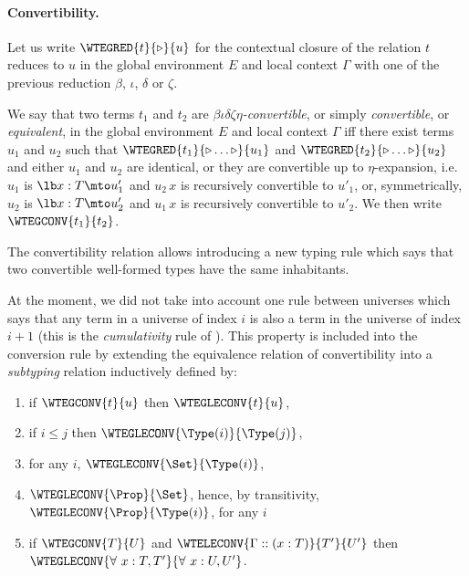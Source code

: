\paragraph[Convertibility.]{Convertibility.\label{convertibility}
}

Let us write $\WTEGRED{t}{\triangleright}{u}$ for the contextual closure of the relation $t$ reduces to $u$ in the global environment $E$ and local context $\Gamma$ with one of the previous reduction $\beta$, $\iota$, $\delta$ or $\zeta$.

We say that two terms $t_1$ and $t_2$ are {\em
  $\beta\iota\delta\zeta\eta$-convertible}, or simply {\em
  convertible}, or {\em equivalent}, in the global environment $E$ and
local context $\Gamma$ iff there exist terms $u_1$ and $u_2$ such that
$\WTEGRED{t_1}{\triangleright \ldots \triangleright}{u_1}$ and
$\WTEGRED{t_2}{\triangleright \ldots \triangleright}{u_2}$ and either
$u_1$ and $u_2$ are identical, or they are convertible up to
$\eta$-expansion, i.e. $u_1$ is $\lb x:T\mto u'_1$ and $u_2\,x$ is
recursively convertible to $u'_1$, or, symmetrically, $u_2$ is $\lb
x:T\mto u'_2$ and $u_1\,x$ is recursively convertible to $u'_2$.  We
then write $\WTEGCONV{t_1}{t_2}$.

The convertibility relation allows introducing a new typing rule
which says that two convertible well-formed types have the same
inhabitants.

At the moment, we did not take into account one rule between universes
which says that any term in a universe of index $i$ is also a term in
the universe of index $i+1$ (this is the {\em cumulativity} rule of
{\CIC}). This property is included into the
conversion rule by extending the equivalence relation of
convertibility into a {\em subtyping} relation inductively defined by:
\begin{enumerate}
\item if $\WTEGCONV{t}{u}$ then $\WTEGLECONV{t}{u}$,
\item if $i \leq j$ then $\WTEGLECONV{\Type(i)}{\Type(j)}$,
\item for any $i$, $\WTEGLECONV{\Set}{\Type(i)}$,
\item $\WTEGLECONV{\Prop}{\Set}$, hence, by transitivity,
  $\WTEGLECONV{\Prop}{\Type(i)}$, for any $i$
\item if $\WTEGCONV{T}{U}$ and $\WTELECONV{\Gamma::(x:T)}{T'}{U'}$ then $\WTEGLECONV{\forall~x:T, T'}{\forall~x:U, U'}$.
\end{enumerate}

